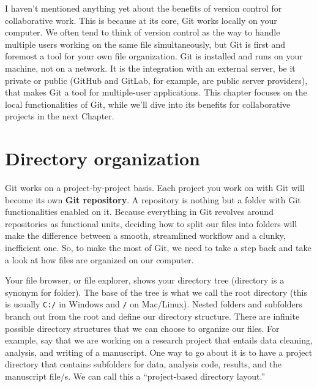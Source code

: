 \documentclass[
]{book}
\begin{document}
I haven't mentioned anything yet about the benefits of version control for collaborative work. This is because at its core, Git works locally on your computer. We often tend to think of version control as the way to handle multiple users working on the same file simultaneously, but Git is first and foremost a tool for your own file organization. Git is installed and runs on your machine, not on a network. It is the integration with an external server, be it private or public (GitHub and GitLab, for example, are public server providers), that makes Git a tool for multiple-user applications. This chapter focuses on the local functionalities of Git, while we'll dive into its benefits for collaborative projects in the next Chapter.

\hypertarget{directory-organization}{%
\section{Directory organization}\label{directory-organization}}

Git works on a project-by-project basis. Each project you work on with Git will become its own \textbf{Git repository}. A repository is nothing but a folder with Git functionalities enabled on it. Because everything in Git revolves around repositories as functional units, deciding how to split our files into folders will make the difference between a smooth, streamlined workflow and a clunky, inefficient one. So, to make the most of Git, we need to take a step back and take a look at how files are organized on our computer.

Your file browser, or file explorer, shows your directory tree (directory is a synonym for folder). The base of the tree is what we call the root directory (this is usually \texttt{C:/} in Windows and \texttt{/} on Mac/Linux). Nested folders and subfolders branch out from the root and define our directory structure. There are infinite possible directory structures that we can choose to organize our files. For example, say that we are working on a research project that entails data cleaning, analysis, and writing of a manuscript. One way to go about it is to have a project directory that contains subfolders for data, analysis code, results, and the manuscript file/s. We can call this a ``project-based directory layout.''
\end{document}
